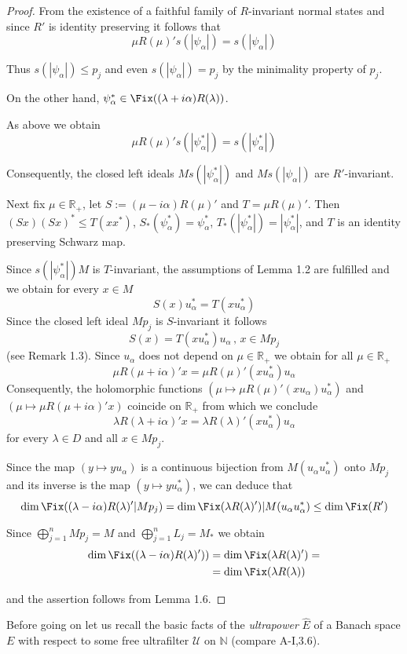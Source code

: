 \begin{proof}
From the existence of a faithful family of $R$-invariant normal states and since $R'$ is identity preserving it follows that
\[
\mu R(\mu)'s(|\psi_{\alpha}|) = s(|\psi_{\alpha}|)
\]







Thus $s(|\psi_{\alpha}|) \leq p_{j}$ and even $s(|\psi_{\alpha}|) = p_{j}$ by the minimality property of $p_{j}$.

On the other hand, $\psi_{\alpha}^{*} \in \Fix((\lambda + i\alpha)R(\lambda))$.

As above we obtain
\[
\mu R(\mu)'s(|\psi_{\alpha}^{*}|) = s(|\psi_{\alpha}^{*}|)
\]

Consequently, the closed left ideals $Ms(|\psi_{\alpha}^{*}|)$ and $Ms(|\psi_{\alpha}|)$ are $R'$-invariant.

Next fix $\mu \in \mathbb{R}_{+}$, let $S := (\mu - i\alpha)R(\mu)'$ and $T = \mu R(\mu)'$.
Then $(Sx)(Sx)^{*} \leq T(xx^{*})$, $S_{*}(\psi_{\alpha}^{*}) = \psi_{\alpha}^{*}$, $T_{*}(|\psi_{\alpha}^{*}|) = |\psi_{\alpha}^{*}|$, and $T$ is an identity preserving Schwarz map.

Since $s(|\psi_{\alpha}^{*}|)M$ is $T$-invariant, the assumptions of Lemma 1.2 are fulfilled and we obtain for every $x \in M$
\[
S(x)u_{\alpha}^{*} = T(xu_{\alpha}^{*})
\]
Since the closed left ideal $Mp_{j}$ is $S$-invariant it follows
\[
S(x) = T(xu_{\alpha}^{*})u_{\alpha} \, , \, x \in Mp_{j}
\]
(see Remark 1.3).
Since $u_{\alpha}$ does not depend on $\mu \in \mathbb{R}_{+}$ we obtain for all $\mu \in \mathbb{R}_{+}$
\[
\mu R(\mu+i\alpha)'x = \mu R(\mu)'(xu_{\alpha}^{*})u_{\alpha}
\]
Consequently, the holomorphic functions $(\mu \mapsto \mu R(\mu)'(xu_{\alpha})u_{\alpha}^{*})$ and $(\mu \mapsto \mu R(\mu+i\alpha)'x)$ coincide on $\mathbb{R}_{+}$ from which we conclude
\[
\lambda R(\lambda+i\alpha)'x = \lambda R(\lambda)'(xu_{\alpha}^{*})u_{\alpha}
\]
for every $\lambda \in D$ and all $x \in Mp_{j}$.

Since the map $(y \mapsto yu_{\alpha})$ is a continuous bijection from $M(u_{\alpha}u_{\alpha}^{*})$ onto $Mp_{j}$ and its inverse is the map $(y \mapsto yu_{\alpha}^{*})$, we can deduce that
\[
\dim \Fix((\lambda-i\alpha)R(\lambda)'|Mp_{j}) = \dim \Fix(\lambda R(\lambda)')|M(u_{\alpha}u_{\alpha}^{*}) \leq \dim \Fix(R')
\]

Since $\bigoplus_{j=1}^{n} Mp_{j} = M$ and $\bigoplus_{j=1}^{n} L_{j} = M_{*}$ we obtain
\begin{align*}
\dim \Fix((\lambda - i\alpha)R(\lambda)')) &= \dim \Fix(\lambda R(\lambda)') = \\
&= \dim \Fix(\lambda R(\lambda))
\end{align*}






and the assertion follows from Lemma 1.6.
\end{proof}
Before going on let us recall the basic facts of the \emph{ultrapower} $\hat{E}$ of a Banach space $E$ with respect to some free ultrafilter $\mathcal{U}$ on $\mathbb{N}$ (compare A-I,3.6).


